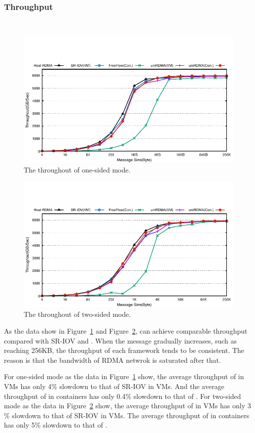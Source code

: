 \subsubsection{\textbf{Throughput}}
\
\noindent

\begin{figure}[!ht]
	\centering
	\includegraphics[width=0.8\linewidth]{images/write-bw.pdf}
	\caption{The throughout of one-sided mode.}
	\label{fig:write-bw}
\end{figure}


\begin{figure}[!ht]
	\centering
	\includegraphics[width=0.8\linewidth]{images/send-bw.pdf}
	\caption{The throughout of two-sided mode.}
	\label{fig:send-bw}
\end{figure}


As the data show in Figure~\ref{fig:write-bw} and Figure~\ref{fig:send-bw}, \sys can achieve comparable throughput compared with SR-IOV and \native. When the message gradually increases, such as reaching 256KB, the throughput of each framework tends to be consistent. The reason is that the bandwidth of RDMA netwrok is saturated after that. %

For one-sided mode as the data in Figure~\ref{fig:write-bw} show, the average throughput of \sys in VMs has only 4$\%$ slowdown to that of SR-IOV in VMs. And the average throughput of \sys in containers has only 0.4$\%$ slowdown to that of \native. For two-sided mode as the data in Figure~\ref{fig:send-bw} show, the average throughput of \sys in VMs has only 3$\%$ slowdown to that of SR-IOV in VMs. The average throughput of \sys in containers has only 5$\%$ slowdown to that of \native.




